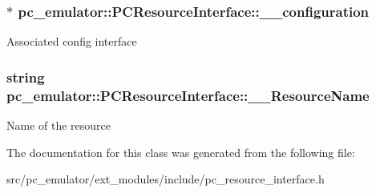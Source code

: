 \subsubsection[{\texorpdfstring{\+\_\+\+\_\+configuration}{__configuration}}]{$\ast$ pc\+\_\+emulator\+::\+P\+C\+Resource\+Interface\+::\+\_\+\+\_\+configuration}\hypertarget{classpc__emulator_1_1PCResourceInterface_a43cf1319d3500c46f211c8e649424503}{}\label{classpc__emulator_1_1PCResourceInterface_a43cf1319d3500c46f211c8e649424503}
Associated config interface 
\subsubsection[{\texorpdfstring{\+\_\+\+\_\+\+Resource\+Name}{__ResourceName}}]{\setlength{\rightskip}{0pt plus 5cm}string pc\+\_\+emulator\+::\+P\+C\+Resource\+Interface\+::\+\_\+\+\_\+\+Resource\+Name}\hypertarget{classpc__emulator_1_1PCResourceInterface_ad37ccb9da92a97e34a51fc92f39d191d}{}\label{classpc__emulator_1_1PCResourceInterface_ad37ccb9da92a97e34a51fc92f39d191d}
Name of the resource 

The documentation for this class was generated from the following file\+:\begin{DoxyCompactItemize}
\item 
src/pc\+\_\+emulator/ext\+\_\+modules/include/pc\+\_\+resource\+\_\+interface.\+h\end{DoxyCompactItemize}
